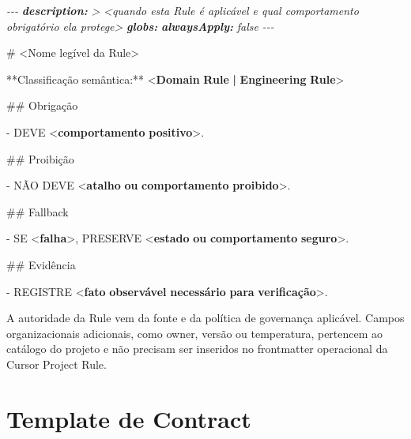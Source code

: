 \documentclass[
  10pt,
  a4paper,
  oneside]{book}
\newenvironment{Shaded}{}{}
\newcommand{\AnnotationTok}[1]{\textcolor[rgb]{0.38,0.63,0.69}{\textbf{\textit{#1}}}}
\newcommand{\CommentTok}[1]{\textcolor[rgb]{0.38,0.63,0.69}{\textit{#1}}}
\newcommand{\DataTypeTok}[1]{\textcolor[rgb]{0.56,0.13,0.00}{#1}}
\newcommand{\ErrorTok}[1]{\textcolor[rgb]{1.00,0.00,0.00}{\textbf{#1}}}
\newcommand{\FunctionTok}[1]{\textcolor[rgb]{0.02,0.16,0.49}{#1}}
\newcommand{\KeywordTok}[1]{\textcolor[rgb]{0.00,0.44,0.13}{\textbf{#1}}}
\newcommand{\NormalTok}[1]{#1}
\newcommand{\SpecialStringTok}[1]{\textcolor[rgb]{0.73,0.40,0.53}{#1}}
\renewenvironment{Shaded}{\begin{snugshade}}{\end{snugshade}}%
\begin{document}
\begin{Shaded}
\begin{Highlighting}[]
\CommentTok{{-}{-}{-}}
\AnnotationTok{description:}\CommentTok{ \textgreater{}}
\CommentTok{  \textless{}quando esta Rule é aplicável e qual comportamento obrigatório ela protege\textgreater{}}
\AnnotationTok{globs:}
\AnnotationTok{alwaysApply:}\CommentTok{ false}
\CommentTok{{-}{-}{-}}

\FunctionTok{\# \textless{}Nome legível da Rule\textgreater{}}

\NormalTok{**Classificação semântica:** }\DataTypeTok{\textless{}}\KeywordTok{Domain} \ErrorTok{Rule} \ErrorTok{|} \ErrorTok{Engineering} \ErrorTok{Rule}\DataTypeTok{\textgreater{}}

\FunctionTok{\#\# Obrigação}

\SpecialStringTok{{-} }\NormalTok{DEVE }\DataTypeTok{\textless{}}\KeywordTok{comportamento} \ErrorTok{positivo}\DataTypeTok{\textgreater{}}\NormalTok{.}

\FunctionTok{\#\# Proibição}

\SpecialStringTok{{-} }\NormalTok{NÃO DEVE }\DataTypeTok{\textless{}}\KeywordTok{atalho} \ErrorTok{ou} \ErrorTok{comportamento} \ErrorTok{proibido}\DataTypeTok{\textgreater{}}\NormalTok{.}

\FunctionTok{\#\# Fallback}

\SpecialStringTok{{-} }\NormalTok{SE }\DataTypeTok{\textless{}}\KeywordTok{falha}\DataTypeTok{\textgreater{}}\NormalTok{, PRESERVE }\DataTypeTok{\textless{}}\KeywordTok{estado} \ErrorTok{ou} \ErrorTok{comportamento} \ErrorTok{seguro}\DataTypeTok{\textgreater{}}\NormalTok{.}

\FunctionTok{\#\# Evidência}

\SpecialStringTok{{-} }\NormalTok{REGISTRE }\DataTypeTok{\textless{}}\KeywordTok{fato} \ErrorTok{observável} \ErrorTok{necessário} \ErrorTok{para} \ErrorTok{verificação}\DataTypeTok{\textgreater{}}\NormalTok{.}
\end{Highlighting}
\end{Shaded}

A autoridade da Rule vem da fonte e da política de governança aplicável.
Campos organizacionais adicionais, como owner, versão ou temperatura,
pertencem ao catálogo do projeto e não precisam ser inseridos no
frontmatter operacional da Cursor Project Rule.

\hypertarget{template-de-contract}{%
\section{Template de Contract}\label{template-de-contract}}
\end{document}
